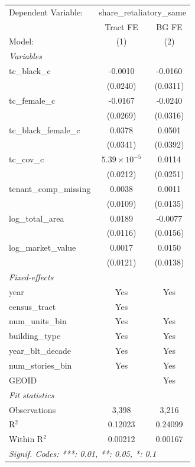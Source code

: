 \begingroup
\centering
\begin{tabular}{lcc}
   \tabularnewline \midrule \midrule
   Dependent Variable: & \multicolumn{2}{c}{share\_retaliatory\_same}\\
                           & Tract FE              & BG FE \\   
   Model:                  & (1)                   & (2)\\  
   \midrule
   \emph{Variables}\\
   tc\_black\_c            & -0.0010               & -0.0160\\   
                           & (0.0240)              & (0.0311)\\   
   tc\_female\_c           & -0.0167               & -0.0240\\   
                           & (0.0269)              & (0.0316)\\   
   tc\_black\_female\_c    & 0.0378                & 0.0501\\   
                           & (0.0341)              & (0.0392)\\   
   tc\_cov\_c              & $5.39\times 10^{-5}$  & 0.0114\\   
                           & (0.0212)              & (0.0251)\\   
   tenant\_comp\_missing   & 0.0038                & 0.0011\\   
                           & (0.0109)              & (0.0135)\\   
   log\_total\_area        & 0.0189                & -0.0077\\   
                           & (0.0116)              & (0.0156)\\   
   log\_market\_value      & 0.0017                & 0.0150\\   
                           & (0.0121)              & (0.0138)\\   
   \midrule
   \emph{Fixed-effects}\\
   year                    & Yes                   & Yes\\  
   census\_tract           & Yes                   & \\  
   num\_units\_bin         & Yes                   & Yes\\  
   building\_type          & Yes                   & Yes\\  
   year\_blt\_decade       & Yes                   & Yes\\  
   num\_stories\_bin       & Yes                   & Yes\\  
   GEOID                   &                       & Yes\\  
   \midrule
   \emph{Fit statistics}\\
   Observations            & 3,398                 & 3,216\\  
   R$^2$                   & 0.12023               & 0.24099\\  
   Within R$^2$            & 0.00212               & 0.00167\\  
   \midrule \midrule
   \multicolumn{3}{l}{\emph{Signif. Codes: ***: 0.01, **: 0.05, *: 0.1}}\\
\end{tabular}
